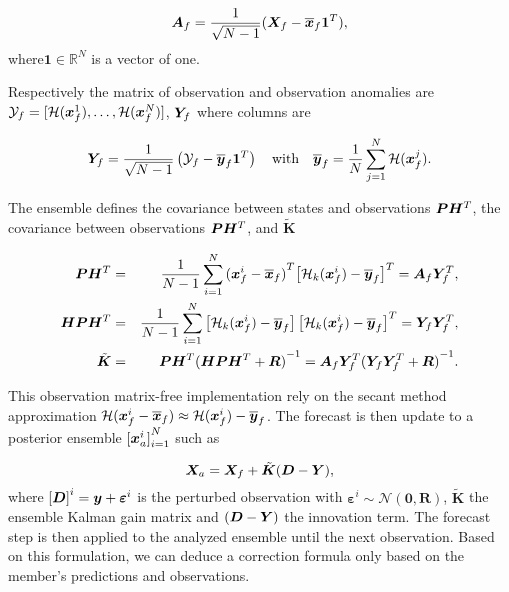\begin{equation*}
    \bm A_f = \frac{1}{\sqrt{N - 1}}(\bm{X}_f - \overline{\bm{x}}_f \bm{1}^T),
\end{equation*}where$\bm{1} \in \mathbb{R}^N$ is a vector of one.

Respectively the matrix of observation and observation anomalies are $\mathcal Y_f = [\mathcal{H}(\bm{x}^1_f), \dots, \mathcal{H}(\bm{x}^N_f)]$, $\bm Y_f$ where columns are

\begin{equation*}
    \bm Y_f = \frac{1}{\sqrt{N - 1}} \left(\mathcal Y_f - \overline{\bm{y}}_f \bm{1}^T \right) \quad \text{with} \quad \overline{\bm{y}}_f = \frac{1}{N} \sum_{j=1}^{N} \mathcal{H}(\bm{x}^j_f).
\end{equation*}

The ensemble defines the covariance between states and observations $\bm{P} \bm H^T$, the covariance between observations $\bm{P} \bm H^T$, and $\tilde{\bm{K}}$

\begin{eqnarray*}
    \bm{P} \bm H^T &=& \frac{1}{N - 1} \sum_{i = 1}^{N} {(\bm{x}^i_f - \overline{\bm{x}}_f)}^T {\left[ \mathcal{H}_k(\bm{x}^i_f) - \overline{\bm{y}}_f\right]}^T = \bm A_f \bm Y_f^T, \\
    \bm H \bm{P} \bm H^T &=& \frac{1}{N -1} \sum_{i = 1}^{N}\left[ \mathcal{H}_k(\bm{x}^i_f) - \overline{\bm{y}}_f\right] {\left[ \mathcal{H}_k(\bm{x}^i_f) - \overline{\bm{y}}_f\right]}^T = \bm Y_f \bm Y_f^T,\\
    \tilde{\bm{K}} &=& \bm{P} \bm H^T{(\bm H \bm{P} \bm H^T + \bm R)}^{-1} = \bm A_f \bm Y_f^T {(\bm Y_f \bm Y_f^T + \bm R)}^{-1}.
\end{eqnarray*}

This observation matrix-free implementation rely on the secant method approximation $\mathcal{H}(\bm{x}^i_f - \overline{\bm{x}}_f) \approx \mathcal{H} (\bm{x}^i_f) - \overline{\bm{y}}_f$.
The forecast is then update to a posterior ensemble ${[\bm{x}^i_a]}_{i=1}^{N}$ such as

\begin{equation} \label{enkf_formula}
    \bm{X}_a = \bm{X}_f + \tilde{\bm{K}} ( \bm{D} - \bm{Y}),
\end{equation}where ${[\bm{D}]}^i = \bm{y} + \bm{\varepsilon}^i$ is the perturbed observation with $\bm{\varepsilon}^i \sim \mathcal{N}(\bm{0}, \bm R) $, $\tilde{\bm{K}}$ the ensemble Kalman gain matrix and $( \bm{D} - \bm{Y})$ the innovation term.
The forecast step is then applied to the analyzed ensemble until the next observation.
Based on this formulation, we can deduce a correction formula only based on the member's predictions and observations.

